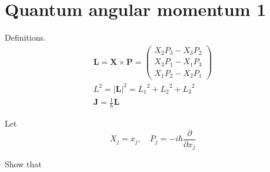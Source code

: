 

\section*{Quantum angular momentum 1}

Definitions.
\begin{gather*}
\mathbf L=\mathbf X\times\mathbf P
=\begin{pmatrix}
X_2P_3-X_3P_2
\\
X_3P_1-X_1P_3
\\
X_1P_2-X_2P_1
\end{pmatrix}
\\[1ex]
L^2=|\mathbf L|^2={L_1}^2+{L_2}^2+{L_3}^2
\\[1ex]
\mathbf J=\frac{1}{\hbar}\mathbf L
\end{gather*}

Let
\begin{equation*}
X_j=x_j,\quad P_j=-i\hbar\frac{\partial}{\partial x_j}
\end{equation*}

Show that

